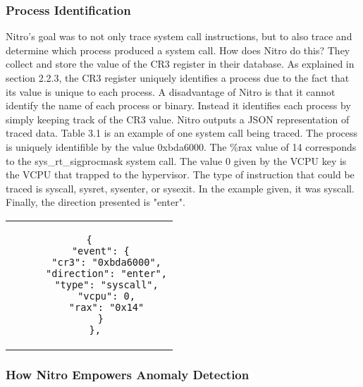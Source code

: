 \documentclass{report}
\begin{document}
\begin{spacing}{1.5}
\subsubsection{Process Identification}

{\large
\leavevmode\newline
Nitro's goal was to not only trace system call instructions, but to also trace and determine which process produced a system call. How does Nitro do this? They collect and store the value of the CR3 register in their database. As explained in section 2.2.3, the CR3 register uniquely identifies a process due to the fact that its value is unique to each process. A disadvantage of Nitro is that it cannot identify the name of each process or binary. Instead it identifies each process by simply keeping track of the CR3 value. Nitro outputs a JSON representation of traced data. Table 3.1 is an example of one system call being traced. The process is uniquely identifible by the value 0xbda6000. The \%rax value of 14 corresponds to the sys\_rt\_sigprocmask system call. The value 0 given by the VCPU key is the VCPU that trapped to the hypervisor. The type of instruction that could be traced is syscall, sysret, sysenter, or sysexit. In the example given, it was syscall. Finally, the direction presented is "enter".
\leavevmode\newline
}


\begin{center}
\begin{tabular}{c}
\begin{lstlisting}[caption={}, frame=none]
  {
    "event": {
      "cr3": "0xbda6000",
      "direction": "enter",
      "type": "syscall",
      "vcpu": 0,
      "rax": "0x14"
    }
  },
\end{lstlisting}
\end{tabular}
\end{center}



\subsubsection{How Nitro Empowers Anomaly Detection}


\end{spacing}
\end{document}
